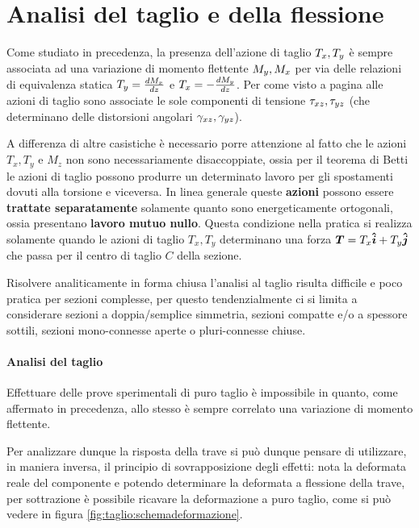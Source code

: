 \section{Analisi del taglio e della flessione}	
	Come studiato in precedenza, la presenza dell'azione di taglio $T_x,T_y$ è sempre associata ad una variazione di momento flettente $M_y,M_x$ per via delle relazioni di equivalenza statica $T_y = \frac{dM_x}{dz}$ e $T_x = - \frac{dM_y}{dz}$. Per come visto a pagina \pageref{eq:sv:equivstatica} alle azioni di taglio sono associate le sole componenti di tensione $\tau_{xz},\tau_{yz}$ (che determinano delle distorsioni angolari $\gamma_{xz},\gamma_{yz}$).
	
	A differenza di altre casistiche è necessario porre attenzione al fatto che le azioni $T_x,T_y$ e $M_z$ non sono necessariamente disaccoppiate, ossia per il teorema di Betti le azioni di taglio possono produrre un determinato lavoro per gli spostamenti dovuti alla torsione e viceversa. In linea generale queste \textbf{azioni} possono essere \textbf{trattate separatamente} solamente quanto sono energeticamente ortogonali, ossia presentano \textbf{lavoro mutuo nullo}. Questa condizione nella pratica si realizza solamente quando le azioni di taglio $T_x,T_y$ determinano una forza $\boldsymbol{T} = T_x \boldsymbol{\hat{i}} + T_y \boldsymbol{\hat{j}}$ che passa per il centro di taglio $C$ della sezione.
	
	Risolvere analiticamente in forma chiusa l'analisi al taglio risulta difficile e poco pratica per sezioni complesse, per questo tendenzialmente ci si limita a considerare sezioni a doppia/semplice simmetria, sezioni compatte e/o a spessore sottili, sezioni mono-connesse aperte o pluri-connesse chiuse.
	
	\paragraph{Analisi del taglio} Effettuare delle prove sperimentali di puro taglio è impossibile in quanto, come affermato in precedenza, allo stesso è sempre correlato una variazione di momento flettente.
	
	Per analizzare dunque la risposta della trave si può dunque pensare di utilizzare, in maniera inversa, il principio di sovrapposizione degli effetti: nota la deformata reale del componente e potendo determinare la deformata a flessione della trave, per sottrazione è possibile ricavare la deformazione a puro taglio, come si può vedere in figura \ref{fig:taglio:schemadeformazione}.
	
